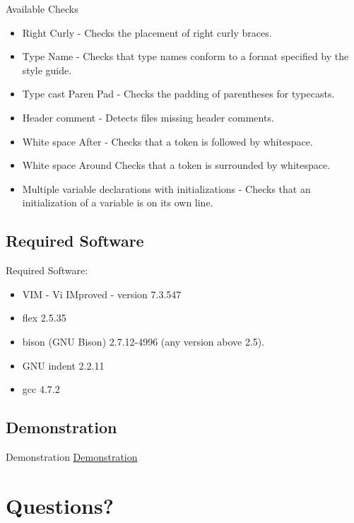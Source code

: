 \documentclass[compress]{beamer}
\begin{document}
\begin{frame}{Available Checks}
\begin{multicols}{2}
{\begin{enumerate}
{{\begin{itemize}
        left parenthesis and before a right parenthesis.
        \item Right Curly - Checks the placement of right curly braces.
        \item Type Name - Checks that type names conform to a format specified by the style guide.
        \item Type cast Paren Pad - Checks the padding of parentheses for typecasts.
        \item Header comment - Detects files missing header comments.
        \item White space After - Checks that a token is followed by whitespace.
        \item White space Around Checks that a token is surrounded by whitespace.
        \item Multiple variable declarations with initializations - Checks that an initialization of a variable is on its own line.
    \end{itemize}}
     }

\end{enumerate}}
\end{multicols}
\end{frame}

\subsection{Required Software}
    \begin{frame}
    Required Software:
        \begin{itemize}
            \item VIM - Vi IMproved - version 7.3.547
            \item flex 2.5.35
            \item bison (GNU Bison) 2.7.12-4996 (any version above 2.5).
            \item GNU indent 2.2.11
            \item gcc 4.7.2
        \end{itemize}
    \end{frame}

\subsection{Demonstration}
\begin{frame}{Demonstration}
\href{http://localhost/uploader.php}{Demonstration}
\end{frame}

\section{Questions?}
\end{document}

